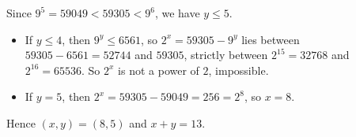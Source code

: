 Since $9^5=59049<59305<9^6$, we have $y\le5$.
\begin{itemize}
\item If $y\le4$, then $9^y\le6561$, so $2^x=59305-9^y$ lies between $59305-6561=52744$ and $59305$, strictly between $2^{15}=32768$ and $2^{16}=65536$. So $2^x$ is not a power of $2$, impossible.
\item If $y=5$, then $2^x=59305-59049=256=2^8$, so $x=8$.
\end{itemize}
Hence $(x,y)=(8,5)$ and $x+y=\boxed{13}$.
